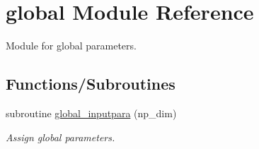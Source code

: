 \hypertarget{namespaceglobal}{}\section{global Module Reference}
\label{namespaceglobal}


Module for global parameters.  


\subsection*{Functions/\+Subroutines}
\begin{DoxyCompactItemize}
\item 
subroutine \mbox{\hyperlink{namespaceglobal_a930b565da2644b675f35b91735e11ce3}{global\+\_\+inputpara}} (np\+\_\+dim)
\begin{DoxyCompactList}\small\item\em Assign global parameters. \end{DoxyCompactList}\end{DoxyCompactItemize}
